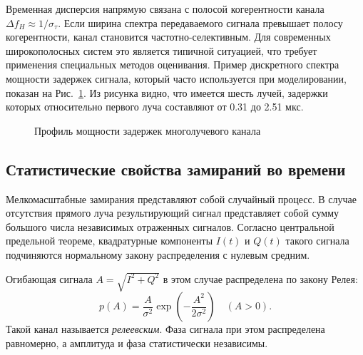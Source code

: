 Временная дисперсия напрямую связана с полосой когерентности канала $\Delta f_H \approx 1/\sigma_\tau$. Если ширина спектра передаваемого сигнала превышает полосу когерентности, канал становится частотно-селективным. Для современных широкополосных систем это является типичной ситуацией, что требует применения специальных методов оценивания. Пример дискретного спектра мощности задержек сигнала, который часто используется при моделировании, показан на Рис.~\ref{fig:delay_profile}. Из рисунка видно, что имеется шесть лучей, задержки которых относительно первого луча составляют от 0.31 до 2.51 мкс.

\begin{figure}[htbp]
    \centering
    \caption{Профиль мощности задержек многолучевого канала}
    \label{fig:delay_profile}
\end{figure}

\subsection{Статистические свойства замираний во времени}

Мелкомасштабные замирания представляют собой случайный процесс. В случае отсутствия прямого луча результирующий сигнал представляет собой сумму большого числа независимых отраженных сигналов. Согласно центральной предельной теореме, квадратурные компоненты $I(t)$ и $Q(t)$ такого сигнала подчиняются нормальному закону распределения с нулевым средним. 

Огибающая сигнала $A = \sqrt{I^2 + Q^2}$ в этом случае распределена по закону Релея:
\begin{equation}
    p(A) = \frac{A}{\sigma^2} \exp\left(-\frac{A^2}{2\sigma^2}\right) \quad (A > 0).
\end{equation}
Такой канал называется \textit{релеевским}. Фаза сигнала при этом распределена равномерно, а амплитуда и фаза статистически независимы.

